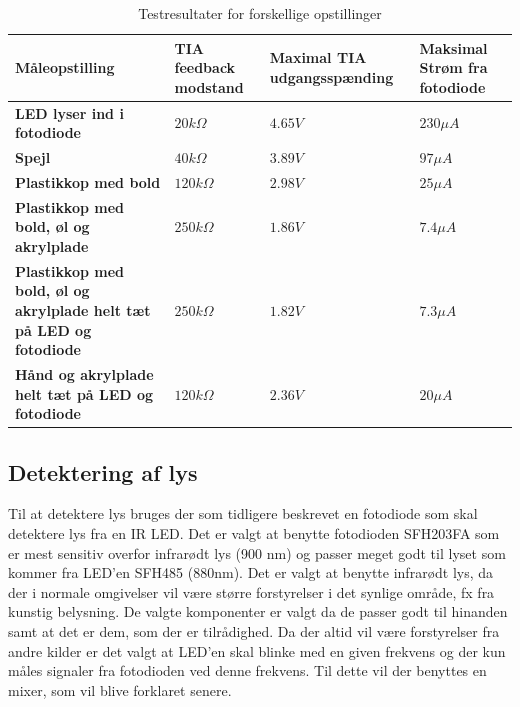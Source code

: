 \documentclass[HardwareDesign/HardwareDesign_main.tex]{subfiles}
\begin{document}
{{\begin{table}[H]
\begin{tabular}{|L{0.25\textwidth}|L{0.25\textwidth}|L{0.25\textwidth}|L{0.25\textwidth}|}
\hline
\textbf{Måleopstilling} & \textbf{TIA feedback modstand} & \textbf{Maximal TIA udgangsspænding} & \textbf{Maksimal Strøm fra fotodiode} \\ \hline
\textbf{LED lyser ind i fotodiode} & $20\si{k\Omega}$ & $4.65\si{V}$ & $230\si{\mu A}$ \\ \hline
\textbf{Spejl} & $40\si{k\Omega}$ & $3.89\si{V}$ & $97\si{\mu A}$ \\ \hline
\textbf{Plastikkop med bold} & $120\si{k\Omega}$ & $2.98\si{V}$ & $25\si{\mu A}$ \\ \hline
\textbf{Plastikkop med bold, øl og akrylplade} & $250\si{k\Omega}$ & $1.86\si{V}$ & $7.4\si{\mu A}$ \\ \hline
\textbf{Plastikkop med bold, øl og akrylplade helt tæt på LED og fotodiode} & $250\si{k\Omega}$ & $1.82\si{V}$ & $7.3\si{\mu A}$ \\ \hline
\textbf{Hånd og akrylplade helt tæt på LED og fotodiode} & $120\si{k\Omega}$ & $2.36\si{V}$ & $20\si{\mu A}$ \\ \hline
\end{tabular}
\caption{Testresultater for forskellige opstillinger}
\label{tab:CupSensorCurrentTest}
\end{table}
}
}
\fi


\subsection{Detektering af lys}
Til at detektere lys bruges der som tidligere beskrevet en fotodiode som skal detektere lys fra en IR LED. 
Det er valgt at benytte fotodioden SFH203FA som er mest sensitiv overfor infrarødt lys (900 nm)\autocite[2]{SFH203FA} og passer meget godt til lyset som kommer fra LED'en SFH485 (880nm)\autocite[3]{SFH485}. Det er valgt at benytte infrarødt lys, da der i normale omgivelser vil være større forstyrelser i det synlige område, fx fra kunstig belysning. De valgte komponenter er valgt da de passer godt til hinanden samt at det er dem, som der er tilrådighed. 
Da der altid vil være forstyrelser fra andre kilder er det valgt at LED'en skal blinke med en given frekvens og der kun måles signaler fra fotodioden ved denne frekvens. Til dette vil der benyttes en mixer, som vil blive forklaret senere. 
\end{document}
